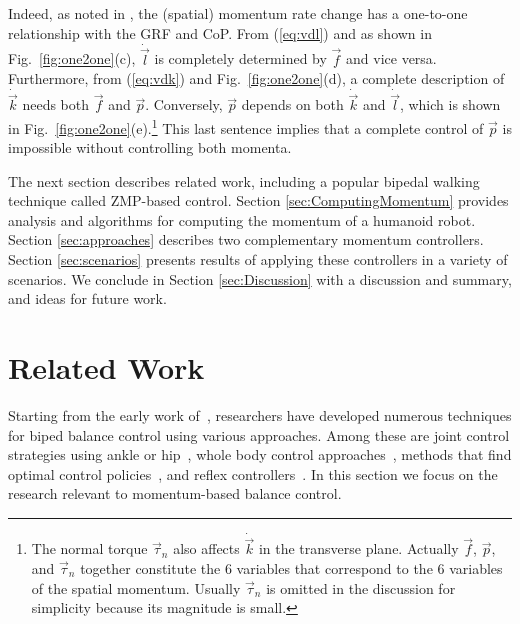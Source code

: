 \documentclass{llncs}
\newcommand{\vp}{\vec{p}}
\newcommand{\vtau}{\vec{\tau}}
\newcommand{\vf}{\vec{f}}
\newcommand{\vdk} {\dot{\vec{k}}}
\newcommand{\vdl} {\dot{\vec{l}}}
\begin{document}
Indeed, as noted in \cite{Macchietto09}, the (spatial) momentum
rate change has a one-to-one relationship with the GRF and CoP.
From (\ref{eq:vdl}) and as shown in Fig.~\ref{fig:one2one}(c), $\vdl$ is completely determined by
$\vf$ and vice versa. Furthermore, from (\ref{eq:vdk}) and Fig.~\ref{fig:one2one}(d), a complete
description of $\vdk$ needs both $\vf$ and
$\vp$. Conversely, $\vp$ depends on both $\vdk$ and $\vdl$,  which is shown in Fig.~\ref{fig:one2one}(e).\footnote{The normal torque $\vtau_n$ also affects $\vdk$ in the
transverse plane. Actually $\vf$, $\vp$, and $\vtau_n$ together
constitute the 6 variables that correspond to the 6 variables of the spatial momentum.
Usually $\vtau_n$ is omitted in the discussion for simplicity
because its magnitude is small.}
This last sentence implies that a complete control of $\vp$ is impossible
without controlling both momenta.%



The next section describes related work, including a popular bipedal walking technique called ZMP-based control.
Section \ref{sec:ComputingMomentum} provides analysis and algorithms for computing the momentum of a humanoid robot.
Section \ref{sec:approaches} describes two complementary momentum controllers.
Section \ref{sec:scenarios} presents results of applying these controllers in a variety of scenarios.
We conclude in Section \ref{sec:Discussion} with a discussion and summary, and ideas for future work.


\section{Related Work}
\label{sec:RelatedWork}


Starting from the early work of~\cite{Vuko69}, researchers have
developed numerous techniques for biped balance control
using various approaches.
Among these are joint control strategies using ankle or hip~\cite{Sano90,Stephens07},
whole body control approaches~\cite{Kagami00,Sugihara02,KKKFHYH03,Choi07,Park05,Stephens10},
methods that find optimal control policies~\cite{Zhou03,Muico09},
and reflex controllers~\cite{Huang05}.
In this section we focus on the research relevant
to momentum-based balance control.
\end{document}
